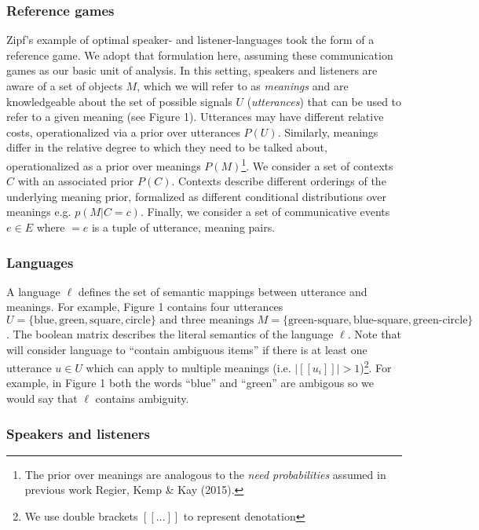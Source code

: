 \documentclass[10pt, letterpaper]{article}
\begin{document}
\subsubsection{Reference games}\label{reference-games}

Zipf's example of optimal speaker- and listener-languages took the form
of a reference game. We adopt that formulation here, assuming these
communication games as our basic unit of analysis. In this setting,
speakers and listeners are aware of a set of objects \(M\), which we
will refer to as \emph{meanings} and are knowledgeable about the set of
possible signals \(U\) (\emph{utterances}) that can be used to refer to
a given meaning (see Figure 1). Utterances may have different relative
costs, operationalized via a prior over utterances \(P(U)\). Similarly,
meanings differ in the relative degree to which they need to be talked
about, operationalized as a prior over meanings
\(P(M)\)\footnote{The prior over meanings are analogous to the \textit{need probabilities} assumed in previous work Regier, Kemp \& Kay (2015).}.
We consider a set of contexts \(C\) with an associated prior \(P(C)\).
Contexts describe different orderings of the underlying meaning prior,
formalized as different conditional distributions over meanings e.g.
\(p(M|C=c)\). Finally, we consider a set of communicative events
\(e \in E\) where \(<u, m> = e\) is a tuple of utterance, meaning
pairs.\par

\subsubsection{Languages}\label{languages}

A language \(\ell\) defines the set of semantic mappings between
utterance and meanings. For example, Figure 1 contains four utterances
\(U = \{\text{blue}, \text{green}, \text{square}, \text{circle}\} \text{ and three meanings }M = \{\text{green-square}, \text{blue-square}, \text{green-circle}\}\).
The boolean matrix describes the literal semantics of the language
\(\ell\). Note that will consider language to ``contain ambiguous
items'' if there is at least one utterance \(u \in U\) which can apply
to multiple meanings (i.e.
\(|[[u_i]]| > 1\))\footnote{We use double brackets $[[\dots]]$ to represent denotation}.
For example, in Figure 1 both the words ``blue'' and ``green'' are
ambigous so we would say that \(\ell\) contains ambiguity.

\subsubsection{Speakers and listeners}\label{speakers-and-listeners}
\end{document}
